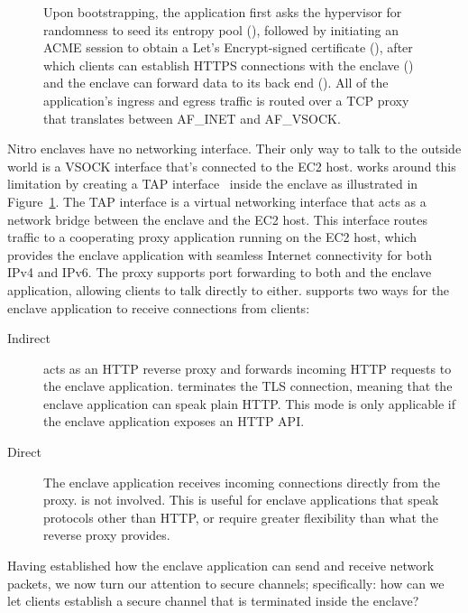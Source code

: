 \begin{figure}[t]
  \centering
  
  \caption{Upon bootstrapping, the application first asks the hypervisor for
    randomness to seed its entropy pool (), followed by initiating an
    ACME session to obtain a Let's Encrypt-signed certificate (), after
    which clients can establish HTTPS connections with the enclave ()
    and the enclave can forward data to its back end ().  All of the
    application's ingress and egress  traffic is routed over a TCP proxy that
    translates between AF\_INET and AF\_VSOCK.}
  \label{fig:networking}
\end{figure}

Nitro enclaves have no networking interface.  Their only way to talk to the
outside world is a VSOCK interface that's connected to the EC2 host.  \Tool{}
works around this limitation by creating a TAP interface~\cite{tun-tap} inside
the enclave as illustrated in Figure~\ref{fig:networking}.  The TAP interface is
a virtual networking interface that acts as a network bridge between the enclave
and the EC2 host.  This interface routes traffic to a cooperating proxy
application running on the EC2 host, which provides the enclave application with
seamless Internet connectivity for both IPv4 and IPv6.  The proxy supports port
forwarding to both \tool{} and the enclave application, allowing clients to talk
directly to either.  \Tool{} supports two ways for the enclave application to
receive connections from clients:

\begin{description}
  \item[Indirect] \Tool{} acts as an HTTP reverse proxy and forwards incoming
    HTTP requests to the enclave application.  \Tool{} terminates the TLS
    connection, meaning that the enclave application can speak plain HTTP.  This
    mode is only applicable if the enclave application exposes an HTTP API.

  \item[Direct] The enclave application receives incoming connections directly
    from the proxy.  \Tool{} is not involved.  This is useful for enclave
    applications that speak protocols other than HTTP, or require greater
    flexibility than what the reverse proxy provides.
\end{description}

Having established how the enclave application can send and receive network
packets, we now turn our attention to secure channels; specifically: how can we
let clients establish a secure channel that is terminated inside the enclave?

